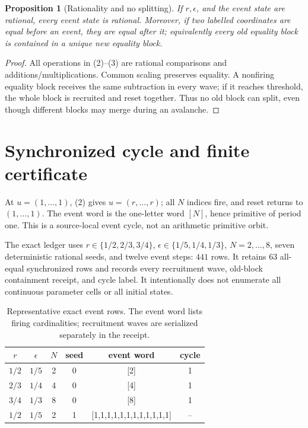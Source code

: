 \documentclass[10pt]{article}
\newtheorem{proposition}{Proposition}
\begin{document}
\begin{proposition}[Rationality and no splitting]
If \(r,\epsilon\), and the event state are rational, every event state is
rational.  Moreover, if two labelled coordinates are equal before an event,
they are equal after it; equivalently every old equality block is contained in
a unique new equality block.
\end{proposition}
\begin{proof}
All operations in (2)--(3) are rational comparisons and additions/multiplications.
Common scaling preserves equality.  A nonfiring equality block receives the
same subtraction in every wave; if it reaches threshold, the whole block is
recruited and reset together.  Thus no old block can split, even though
different blocks may merge during an avalanche.  \end{proof}

\section{Synchronized cycle and finite certificate}
At \(u=(1,\ldots,1)\), (2) gives \(u=(r,\ldots,r)\); all \(N\) indices fire,
and reset returns to \((1,\ldots,1)\).  The event word is the one-letter word
\([N]\), hence primitive of period one.  This is a source-local event cycle,
not an arithmetic primitive orbit.

The exact ledger uses \(r\in\{1/2,2/3,3/4\}\),
\(\epsilon\in\{1/5,1/4,1/3\}\), \(N=2,\ldots,8\), seven deterministic
rational seeds, and twelve event steps: \(441\) rows.  It retains 63
all-equal synchronized rows and records every recruitment wave, old-block
containment receipt, and cycle label.  It intentionally does not enumerate
all continuous parameter cells or all initial states.

\begin{table}[t]
\centering
\caption{Representative exact event rows.  The event word lists firing
cardinalities; recruitment waves are serialized separately in the receipt.}
\begin{tabular}{cccccc}
\toprule
\(r\) & \(\epsilon\) & \(N\) & seed & event word & cycle\\
\midrule
\(1/2\)&\(1/5\)&2&0&[2]&1\\
\(2/3\)&\(1/4\)&4&0&[4]&1\\
\(3/4\)&\(1/3\)&8&0&[8]&1\\
\(1/2\)&\(1/5\)&2&1&[1,1,1,1,1,1,1,1,1,1,1,1]&--\\
\bottomrule
\end{tabular}
\end{table}
\end{document}
